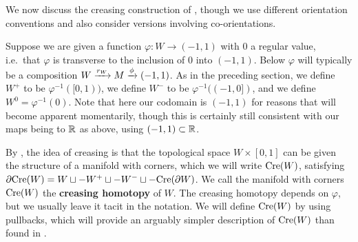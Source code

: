 We now discuss the creasing construction of \cite[Section 2.4]{Lipy14}, though we use different orientation conventions and also consider versions involving co-orientations.

Suppose we are given a function $\varphi \colon W \to (-1,1)$ with $0$ a regular value, i.e.\ that $\varphi$ is transverse to the inclusion of $0$ into $(-1,1)$.
Below $\varphi$ will typically be a composition $W \xrightarrow{r_W} M \xrightarrow{\phi} (-1,1)$.
As in the preceding section, we define $W^+$ to be $\varphi^{-1}( [0,1))$, we define $W^-$ to be $\varphi^{-1} ((-1, 0])$, and we define $W^0 = \varphi^{-1}(0)$.
Note that here our codomain is $(-1,1)$ for reasons that will become apparent momentarily, though this is certainly still consistent with our maps being to $\mathbb{R}$ as above, using $(-1,1) \subset \mathbb{R}$.

By \cite[Lemma~9]{Lipy14}, the idea of creasing is that the topological space $W \times [0,1]$ can be given the structure of a manifold with corners, which we will write $\mathrm{Cre}(W)$, satisfying $\partial \mathrm{Cre}(W) = W \sqcup -W^+ \sqcup -W^- \sqcup - \mathrm{Cre}(\partial W)$.
We call the manifold with corners $\mathrm{Cre}(W)$ the \textbf{creasing homotopy} of $W$.
The creasing homotopy depends on $\varphi$, but we usually leave it tacit in the notation.
We will define $\mathrm{Cre}(W)$ by using pullbacks, which will provide an arguably simpler description of $\mathrm{Cre}(W)$ than found in \cite{Lipy14}.

